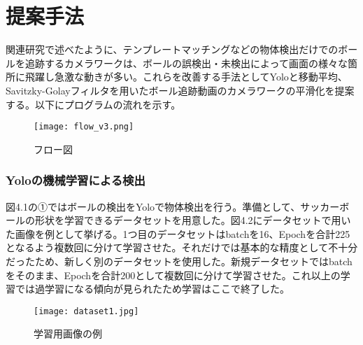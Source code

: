 \documentclass[11pt,a4j]{jreport}
\begin{document}



\chapter{提案手法}
関連研究で述べたように、テンプレートマッチングなどの物体検出だけでのボールを追跡するカメラワークは、ボールの誤検出・未検出によって画面の様々な箇所に飛躍し急激な動きが多い。これらを改善する手法としてYoloと移動平均、Savitzky-Golayフィルタを用いたボール追跡動画のカメラワークの平滑化を提案する。以下にプログラムの流れを示す。\\

\begin{figure}[htbp]
    \centering
    \texttt{[image: flow\_v3.png]}
    \caption{フロー図}
    \label{fig:ラベル}
\end{figure}

\subsection{Yoloの機械学習による検出}
図4.1の①ではボールの検出をYoloで物体検出を行う。準備として、サッカーボールの形状を学習できるデータセットを用意した。図4.2にデータセットで用いた画像を例として挙げる。1つ目のデータセットはbatchを16、Epochを合計225となるよう複数回に分けて学習させた。それだけでは基本的な精度として不十分だったため、新しく別のデータセットを使用した。新規データセットではbatchをそのまま、Epochを合計200として複数回に分けて学習させた。これ以上の学習では過学習になる傾向が見られたため学習はここで終了した。
\vspace{\baselineskip}
\begin{figure}[htbp]
    \centering
    \texttt{[image: dataset1.jpg]}
    \caption{学習用画像の例}
    \label{fig:ラベル}
\end{figure}
\end{document}
